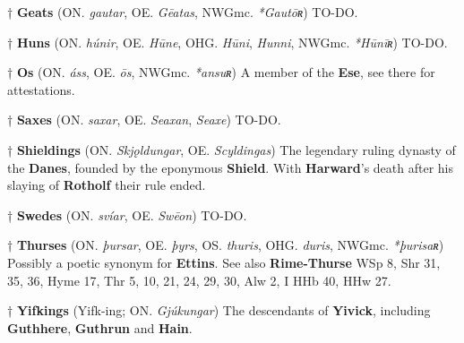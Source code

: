 † \textbf{Geats} (ON. \emph{gautar}, OE. \emph{Gēatas}, NWGmc. \emph{*Gautōʀ})
 TO-DO.

† \textbf{Huns} (ON. \emph{húnir}, OE. \emph{Hūne}, OHG. \emph{Hūni}, \emph{Hunni}, NWGmc. \emph{*Hūnīʀ})
 TO-DO.
 
† \textbf{Os} (ON. \emph{áss}, OE. \emph{ōs}, NWGmc. \emph{*ansuʀ})
 A member of the \textbf{Ese}, see there for attestations.
 
† \textbf{Saxes} (ON. \emph{saxar}, OE. \emph{Seaxan}, \emph{Seaxe})
 TO-DO.
 
† \textbf{Shieldings} (ON. \emph{Skjǫldungar}, OE. \emph{Scyldingas})
 The legendary ruling dynasty of the \textbf{Danes}, founded by the eponymous \textbf{Shield}. With \textbf{Harward}'s death after his slaying of \textbf{Rotholf} their rule ended.

† \textbf{Swedes} (ON. \emph{svíar}, OE. \emph{Swēon})
 TO-DO.

† \textbf{Thurses} (ON. \emph{þursar}, OE. \emph{þyrs}, OS. \emph{thuris}, OHG. \emph{duris}, NWGmc. \emph{*þurisaʀ})
 Possibly a poetic synonym for \textbf{Ettins}. See also \textbf{Rime-Thurse}
 WSp 8, Shr 31, 35, 36, Hyme 17, Thr 5, 10, 21, 24, 29, 30, Alw 2, I HHb 40, HHw 27.

† \textbf{Yifkings} (Yifk-ing; ON. \emph{Gjúkungar})
 The descendants of \textbf{Yivick}, including \textbf{Guthhere}, \textbf{Guthrun} and \textbf{Hain}.
